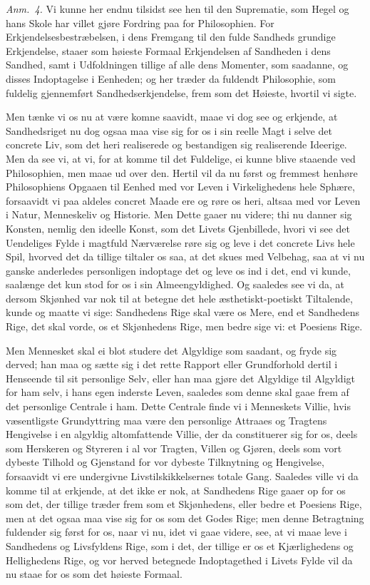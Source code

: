 \documentclass[12pt,a4paper]{book}
\newcommand{\apage}[1]{\marginnote{\footnotesize\textit{[#1]}}}
\begin{document}
{\small\emph{Anm.~4.} Vi kunne her endnu tilsidst see hen til den Suprematie, som
Hegel og hans Skole har villet gjøre Fordring paa for Philosophien. For
Erkjendelsesbestræbelsen, i dens Fremgang til den fulde Sandheds grundige
Erkjendelse, staaer som høieste Formaal Erkjendelsen af Sandheden i dens Sandhed,
samt i Udfoldningen tillige af alle dens Momenter, som saadanne, og disses
Indoptagelse i Eenheden; og her træder da fuldendt Philosophie, som fuldelig
gjennemført Sandhedserkjendelse, frem som det Høieste, hvortil vi sigte.\par}

Men tænke vi os nu at være komne saavidt, maae vi dog see og erkjende, at
Sandhedsriget nu dog ogsaa maa vise sig for os i sin reelle Magt i selve det concrete
Liv, som det heri realiserede og bestandigen sig realiserende Ideerige. Men da see
vi, at vi, for at komme til det Fuldelige, ei kunne blive staaende ved Philosophien,
men maae ud over den. Hertil vil da nu først og fremmest henhøre Philosophiens
Opgaaen til Eenhed med vor Leven i Virkelighedens hele Sphære, forsaavidt vi paa
aldeles concret Maade ere og røre os heri, altsaa med vor Leven i Natur, Menneskeliv
og Historie. Men Dette gaaer nu videre; thi nu danner sig Konsten, nemlig den ideelle
Konst, som det Livets Gjenbillede, hvori vi see det Uendeliges Fylde i magtfuld
Nærværelse røre sig og leve i det concrete Livs hele Spil, hvorved det da tillige
tiltaler os saa, at det skues med Velbehag, saa at vi nu ganske anderledes
personligen indoptage det og leve os ind i det, end vi kunde, saalænge det kun stod
for os i sin Almeengyldighed. Og saaledes see vi da, at dersom Skjønhed var nok til
at betegne det hele æsthetiskt-poetiskt Tiltalende, kunde og maatte vi sige:
Sandhedens Rige skal være os Mere, end et Sandhedens Rige, det skal vorde,  \apage{86} os et
Skjønhedens Rige, men bedre sige vi: et Poesiens Rige.

Men Mennesket skal ei blot studere det Algyldige som saadant, og fryde sig derved;
han maa og sætte sig i det rette Rapport eller Grundforhold dertil i Henseende til
sit personlige Selv, eller han maa gjøre det Algyldige til Algyldigt for ham selv, i
hans egen inderste Leven, saaledes som denne skal gaae frem af det personlige
Centrale i ham. Dette Centrale finde vi i Menneskets Villie, hvis væsentligste
Grundyttring maa være den personlige Attraaes og Tragtens Hengivelse i en algyldig
altomfattende Villie, der da constituerer sig for os, deels som Herskeren og Styreren
i al vor Tragten, Villen og Gjøren, deels som vort dybeste Tilhold og Gjenstand for
vor dybeste Tilknytning og Hengivelse, forsaavidt vi ere undergivne
Livstilskikkelsernes totale Gang. Saaledes ville vi da komme til at erkjende, at det
ikke er nok, at Sandhedens Rige gaaer op for os som det, der tillige træder frem som
et Skjønhedens, eller bedre et Poesiens Rige, men at det ogsaa maa vise sig for os
som det Godes Rige; men denne Betragtning fuldender sig først for os, naar vi nu,
idet vi gaae videre, see, at vi maae leve i Sandhedens og Livsfyldens Rige, som i
det, der tillige er os et Kjærlighedens og Hellighedens Rige, og vor herved betegnede
Indoptagethed i Livets Fylde vil da nu staae for os som det høieste Formaal.
\end{document}
